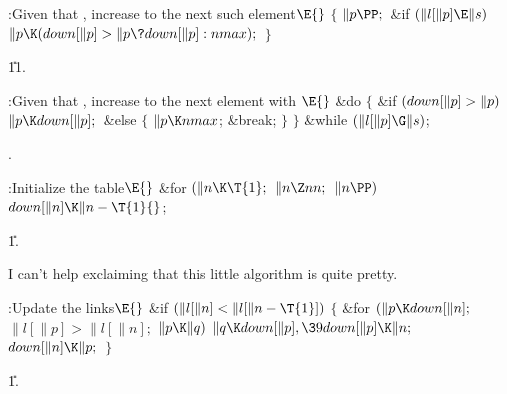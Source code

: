 \Y\B\4:Given that , increase  to the next such
element\X${}\E{}$\6
${}\{{}$\1\6
${}\|p\PP;{}$\6
\&{if} ${}(\|l[\|p]\E\|s){}$\1\5
${}\|p\K(\\{down}[\|p]>\|p\?\\{down}[\|p]:\\{nmax});{}$\2\6
\4${}\}{}$\2\par
\U11.\fi

\B{}:Given that , increase 
to the next element with \X${}\E{}$\6
\&{do}\5
${}\{{}$\1\6
\&{if} ${}(\\{down}[\|p]>\|p){}$\1\5
${}\|p\K\\{down}[\|p];{}$\2\6
\&{else}\5
${}\{{}$\1\6
${}\|p\K\\{nmax}{}$;\5
\&{break};\6
\4${}\}{}$\2\6
\4${}\}{}$\5
\2\5
\&{while} ${}(\|l[\|p]\G\|s){}$;\par
{}.\fi

\B{}:Initialize the  table\X${}\E{}$\6
\&{for} ${}(\|n\K\T{1};{}$ ${}\|n\Z\\{nn};{}$ ${}\|n\PP){}$\1\5
${}\\{down}[\|n]\K\|n-\T{1}{}$;\2\par
\U1.\fi

I can't help exclaiming that this little algorithm is
quite pretty.

\Y\B\4:Update the  links\X${}\E{}$\6
\&{if} ${}(\|l[\|n]<\|l[\|n-\T{1}]){}$\5
${}\{{}$\1\6
\&{for} ${}(\|p\K\\{down}[\|n];{}$ ${}\|l[\|p]>\|l[\|n];{}$ ${}\|p\K\|q){}$\1\5
${}\|q\K\\{down}[\|p],\39\\{down}[\|p]\K\|n;{}$\2\6
${}\\{down}[\|n]\K\|p;{}$\6
\4${}\}{}$\2\par
\U1.\fi

